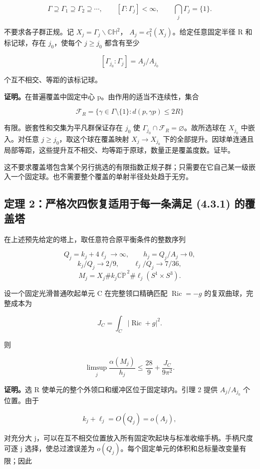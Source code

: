 \documentclass[UTF8,11pt,openany,fontset=none]{ctexbook}
\theoremstyle{definition}
\theoremstyle{remark}
\begin{document}
\[
\Gamma\supseteq\Gamma_1\supseteq\Gamma_2\supseteq\cdots,
\qquad [\Gamma:\Gamma_j]<\infty,
\qquad \bigcap_j\Gamma_j=\{1\}.
\tag{4.3.1}
\]

不要求各子群正规。记 \(X_j=\Gamma_j\backslash\mathbb{CH}^2\)， \(A_j=c_1^2(X_j)\)。给定任意固定半径 R 和标记球，存在 \(j_0\)，使每个 \(j\ge j_0\) 都含有至少

\[
[\Gamma_{j_0}:\Gamma_j]=A_j/A_{j_0}
\]

个互不相交、等距的该标记球。

\textbf{证明。}在普遍覆盖中固定中心 p。由作用的适当不连续性，集合

\[
\mathcal F_R=\{\gamma\in\Gamma\setminus\{1\}:d(p,\gamma p)\le2R\}
\]

有限。嵌套性和交集为平凡群保证存在 \(j_0\) 使 \(\Gamma_{j_0}\cap\mathcal F_R=\varnothing\)。故所选球在 \(X_{j_0}\) 中嵌入。对任意 \(j\ge j_0\)，取这个球在覆盖映射 \(X_j\to X_{j_0}\) 下的全部提升。因球单连通且局部等距，这些提升互不相交、均等距于原球，数量正是覆盖度数。证毕。

这不要求覆盖塔包含某个另行挑选的有限指数正规子群；只需要在它自己某一级嵌入一个固定球。也不需要整个覆盖的单射半径处处趋于无穷。

\subsection{定理 2：严格次四恢复适用于每一条满足 (4.3.1) 的覆盖塔}\label{v4-ux5b9aux7406-2ux4e25ux683cux6b21ux56dbux6062ux590dux9002ux7528ux4e8eux6bcfux4e00ux6761ux6ee1ux8db3-4.3.1-ux7684ux8986ux76d6ux5854}

在上述预先给定的塔上，取任意符合原平衡条件的整数序列

\[
Q_j=k_j+4\ell_j\to\infty,\qquad h_j=Q_j/A_j\to0,
\] \[
k_j/Q_j\to2/9,\qquad \ell_j/Q_j\to7/36,
\] \[
M_j=X_j\#k_j\overline{\mathbb{CP}}^{\,2}
\#\ell_j(S^1\times S^3).
\]

设一个固定光滑普通吹起单元 C 在完整领口精确匹配 \(\operatorname{Ric}=-g\) 的复双曲球，完整成本为

\[
J_C=\int_C|\operatorname{Ric}+g|^2.
\]

则

\[
\boxed{\limsup_j\frac{\alpha(M_j)}{h_j}
\le\frac{28}{9}+\frac{J_C}{9\pi^2}.}
\tag{4.3.2}
\]

\textbf{证明。}选 R 使单元的整个外领口和缓冲区位于固定球内。引理 2 提供 \(A_j/A_{j_0}\) 个位置。由于

\[
k_j+\ell_j=O(Q_j)=o(A_j),
\]

对充分大 j，可以在互不相交位置放入所有固定吹起块与标准收缩手柄。手柄尺度可逐 j 选择，使总过渡误差为 \(o(Q_j)\)。每个固定单元的体积和总标量改变量有限；因此
\end{document}
